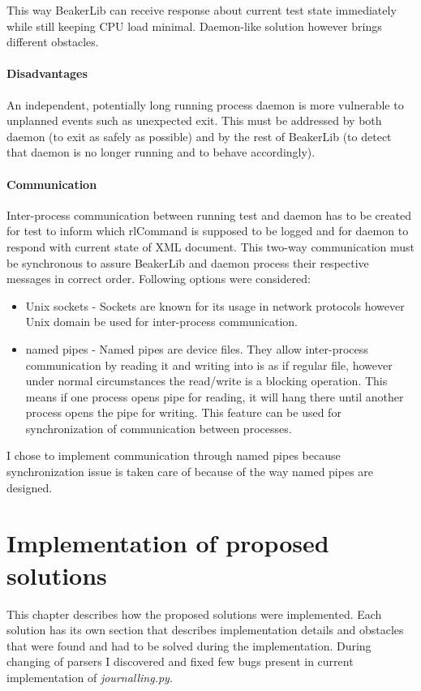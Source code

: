 This way BeakerLib can receive response about current test state immediately while still keeping CPU load minimal. Daemon-like solution however brings different obstacles.

\subsubsection{Disadvantages}
An independent, potentially long running process daemon is more vulnerable to unplanned events such as unexpected exit. This must be addressed by both daemon (to exit as safely as possible)  and by the rest of BeakerLib (to detect that daemon is no longer running and to behave accordingly). 

\subsubsection{Communication}
Inter-process communication between running test and daemon has to be created for test to inform which rlCommand is supposed to be logged and for daemon to respond with current state of XML document. This two-way communication must be synchronous to assure BeakerLib and daemon process their respective messages in correct order. Following options were considered:

\begin{itemize}
\item Unix sockets  -  Sockets are known for its usage in network protocols however Unix domain be used for inter-process communication.
\item named pipes - Named pipes are device files. They allow inter-process communication by reading it and writing into is as if regular file, however under normal circumstances the read/write is a blocking operation\cite{pipes_blocking}. This means if one process opens pipe for reading, it will hang there until another process opens the pipe for writing. This feature can be used for synchronization of communication between processes. 
\end{itemize}

I chose to implement communication through named pipes because synchronization issue is taken care of because of the way named pipes are designed.


\chapter{Implementation of proposed solutions}
\label{implementations}
This chapter describes how the proposed solutions were implemented. Each solution has its own section that describes implementation details and obstacles that were found and had to be solved during the implementation.
During changing of parsers I discovered and fixed few bugs present in current implementation of \textit{journalling.py}.

